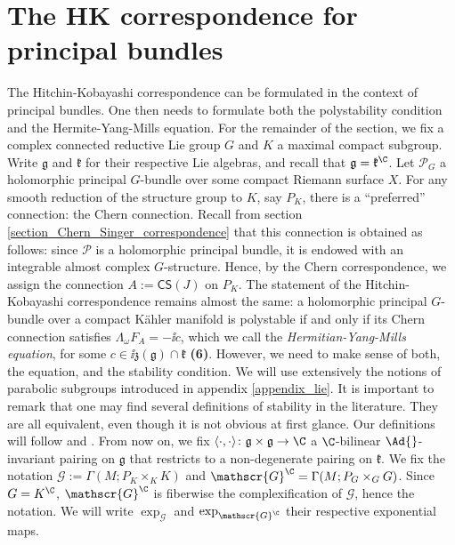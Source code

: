 \section{The HK correspondence for principal bundles}
{\color{violet}
The Hitchin-Kobayashi correspondence can be formulated in the context of principal bundles. One then needs to formulate both the polystability condition and the Hermite-Yang-Mills equation. For the remainder of the section, we fix a complex connected reductive Lie group \(G\) and \(K\) a maximal compact subgroup. Write \(\mathfrak{g}\) and \(\mathfrak{k}\) for their respective Lie algebras, and recall that \(\mathfrak{g}=\mathfrak{k}^\C\). Let \(\mathcal{P}_G\) a holomorphic principal \(G\)-bundle over some compact Riemann surface \(X\). For any smooth reduction of the structure group to \(K\), say \(P_K\), there is a ``preferred'' connection: the Chern connection. Recall from section \ref{section_Chern_Singer_correspondence} that this connection is obtained as follows: since \(\mathcal{P}\) is a holomorphic principal bundle, it is endowed with an integrable almost complex \(G\)-structure. Hence, by the Chern correspondence, we assign the connection \(A:=\mathsf{CS}(J)\) on \(P_K\). The statement of the Hitchin-Kobayashi correspondence remains almost the same: a holomorphic principal \(G\)-bundle over a compact Kähler manifold is polystable if and only if its Chern connection satisfies \(\Lambda_\omega F_A=-\ii c\), which we call the \textit{Hermitian-Yang-Mills equation}, for some \(c \in \ii \mathfrak{z}(\mathfrak{g}) \cap \mathfrak{k}\) \textbf{(6)}. However, we need to make sense of both, the equation, and the stability condition. We will use extensively the notions of parabolic subgroups introduced in appendix \ref{appendix_lie}. It is important to remark that one may find several definitions of stability in the literature. They are all equivalent, even though it is not obvious at first glance. Our definitions will follow \parencite{i1999hitchin} and \parencite{garcia2009hitchin}. From now on, we fix \(\langle \cdot, \cdot \rangle\colon \mathfrak{g} \times \mathfrak{g} \to \C\) a \(\C\)-bilinear \(\Ad{}\)-invariant pairing on \(\mathfrak{g}\) that restricts to a non-degenerate pairing on \(\mathfrak{k}\). We fix the notation \(\mathscr{G}:=\Gamma(M; P_K \times _K K)\) and \(\mathscr{G}^\C=\Gamma(M; P_G \times_G G)\). Since \(G=K^\C\), \(\mathscr{G}^\C\) is fiberwise the complexification of \(\mathscr{G}\), hence the notation. We will write \(\exp_{\mathscr{G}}\) and \(\exp_{\mathscr{G}^\C}\) their respective exponential maps. 

}
